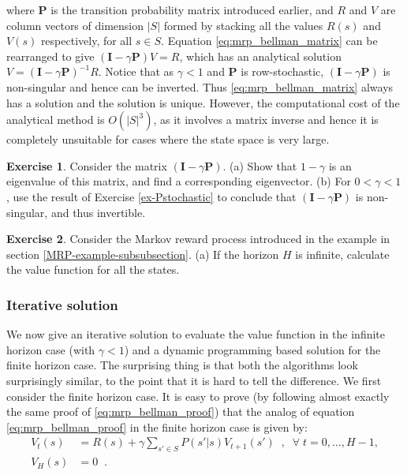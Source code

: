 \documentclass{article}
\theoremstyle{definition}
\newtheorem{exercise}{Exercise}[section]
\theoremstyle{remark}
\begin{document}
where $\mathbf{P}$ is the transition probability matrix introduced earlier, and $R$ and $V$ are column vectors of dimension $|S|$ formed by stacking all the values $R(s)$ and $V(s)$ respectively, for all $s \in S$. Equation \eqref{eq:mrp_bellman_matrix} can be rearranged to give $(\mathbf{I} - \gamma \mathbf{P})V = R$, which has an analytical solution $V = (\mathbf{I} - \gamma \mathbf{P})^{-1}R$. Notice that as $\gamma < 1$ and $\mathbf{P}$ is row-stochastic, $(\mathbf{I} - \gamma \mathbf{P})$ is non-singular and hence can be inverted. Thus \eqref{eq:mrp_bellman_matrix} always has a solution and the solution is unique. However, the computational cost of the analytical method is $O(|S|^3)$, as it involves a matrix inverse and hence it is completely unsuitable for cases where the state space is very large.

\begin{exercise}
Consider the matrix $(\mathbf{I} - \gamma \mathbf{P})$. (a) Show that $1-\gamma$ is an eigenvalue of this matrix, and find a corresponding eigenvector. (b) For $0 < \gamma < 1$, use the result of Exercise \ref{ex-Pstochastic} to conclude that $(\mathbf{I} - \gamma \mathbf{P})$ is non-singular, and thus invertible.
\label{ex-invertible-matrix}
\end{exercise}

\begin{exercise}
Consider the Markov reward process introduced in the example in section \ref{MRP-example-subsubsection}. (a) If the horizon $H$ is infinite, calculate the value function for all the states.
\label{ex-MRP-example}
\end{exercise}

\subsubsection{Iterative solution}
We now give an iterative solution to evaluate the value function in the infinite horizon case (with $\gamma < 1$) and a dynamic programming based solution for the finite horizon case. The surprising thing is that both the algorithms look surprisingly similar, to the point that it is hard to tell the difference. We first consider the finite horizon case. It is easy to prove (by following almost exactly the same proof of \eqref{eq:mrp_bellman_proof}) that the analog of equation \eqref{eq:mrp_bellman_proof} in the finite horizon case is given by:
\begin{equation}
\begin{split}
V_t(s) &= R(s) + \gamma \sum_{s' \in S} P(s'|s)V_{t+1}(s') \;\;,\;\; \forall \; t = 0,\dots,H-1, \\
V_H(s) &= 0 \;\;.
\end{split}
\label{eq:mrp_bellman_finite}
\end{equation}
\end{document}
